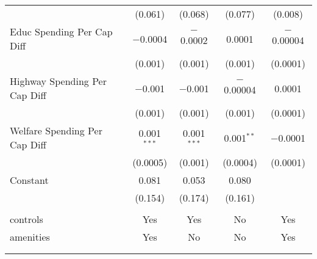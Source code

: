 \begin{table}[!htbp]
\begin{tabular}{@{\extracolsep{5pt}}lcccc}
  & (0.061) & (0.068) & (0.077) & (0.008) \\ 
  Educ Spending Per Cap Diff & $-$0.0004 & $-$0.0002 & 0.0001 & $-$0.00004 \\ 
  & (0.001) & (0.001) & (0.001) & (0.0001) \\ 
  Highway Spending Per Cap Diff & $-$0.001 & $-$0.001 & $-$0.00004 & 0.0001 \\ 
  & (0.001) & (0.001) & (0.001) & (0.0001) \\ 
  Welfare Spending Per Cap Diff & 0.001$^{***}$ & 0.001$^{***}$ & 0.001$^{**}$ & $-$0.0001 \\ 
  & (0.0005) & (0.001) & (0.0004) & (0.0001) \\ 
  Constant & 0.081 & 0.053 & 0.080 &  \\ 
  & (0.154) & (0.174) & (0.161) &  \\ 
 \hline \\[-1.8ex] 
controls & Yes & Yes & No & Yes \\ 
amenities & Yes & No & No & Yes \\ 
\hline \\[-1.8ex] 
\hline 
\hline \\[-1.8ex] 
\end{tabular} 
\end{table} 
